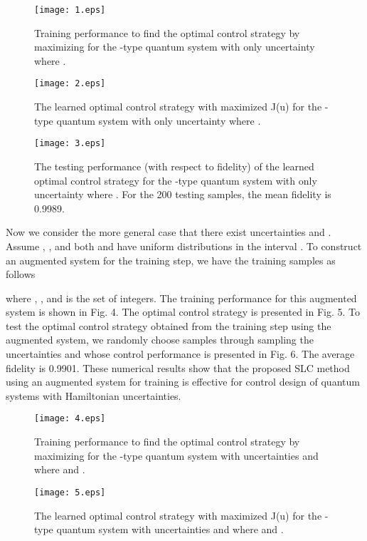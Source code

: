 \documentclass[letterpaper, 10 pt, conference]{ieeeconf}
\begin{document}
\begin{figure}\label{fig1}
\centering
\texttt{[image: 1.eps]}
\caption{Training performance to find the optimal control
strategy by maximizing  for the -type quantum system with
only uncertainty  where .}
\end{figure}

\begin{figure}\label{fig2}
\centering
\texttt{[image: 2.eps]}
\caption{The learned optimal control strategy with maximized J(u)
for the -type quantum system with
only uncertainty  where .}
\end{figure}

\begin{figure*}\label{fig3}
\centering
\texttt{[image: 3.eps]}
\caption{The testing performance (with respect to fidelity) of the
learned optimal control strategy for the -type quantum system with
only uncertainty  where . For the 200 testing samples, the mean fidelity is 0.9989.}
\end{figure*}

Now we consider the more general case that there exist uncertainties   and . Assume
, ,  and both  and  have uniform
distributions in the interval .
To construct an augmented system for the
training step, we have the training samples as follows

where , ,  and  is the set of integers.
The training
performance for this augmented system is shown in Fig. 4. The optimal control strategy is
presented in Fig. 5.
To test the optimal control strategy obtained from the training
step using the augmented system, we randomly choose 
samples through sampling the uncertainties  and  whose control performance is presented
in Fig. 6. The average fidelity is 0.9901.
These numerical results show that the proposed SLC method
using an augmented system for training is effective for control
design of quantum systems with Hamiltonian uncertainties.


\begin{figure}\label{fig4}
\centering
\texttt{[image: 4.eps]}
\caption{Training performance to find the optimal control
strategy by maximizing  for the -type quantum system with
uncertainties  and  where  and .}
\end{figure}

\begin{figure}\label{fig5}
\centering
\texttt{[image: 5.eps]}
\caption{The learned optimal control strategy with maximized J(u)
for the -type  quantum system with
uncertainties  and  where  and .}
\end{figure}
\end{document}
